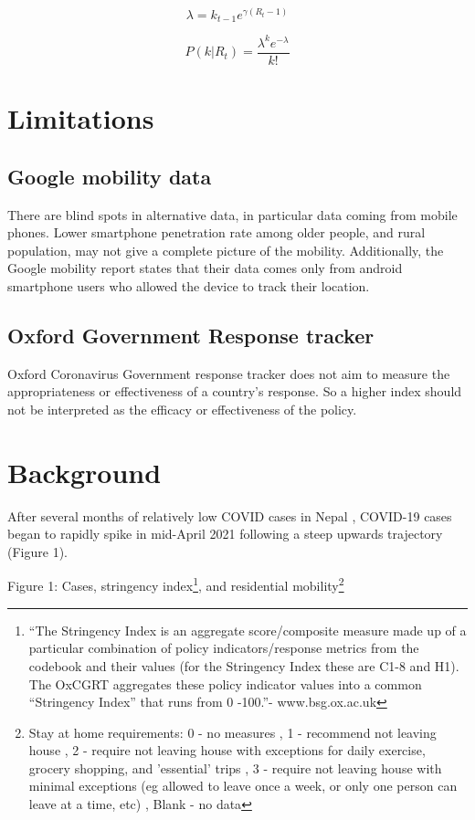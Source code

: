 \documentclass{article}
\begin{document}
$$ \lambda = k_{t-1}e^{\gamma(R_t-1)}$$

$$P\left(k|R_t\right) = \frac{\lambda^k e^{-\lambda}}{k!}$$
\section{Limitations}
\label{sec:headings}

\subsection{Google mobility data}
There are blind spots in alternative data, in particular data coming from mobile phones. Lower smartphone penetration rate among older people, and rural population, may not give a complete picture of the mobility. Additionally, the Google mobility report states that their data comes only from android smartphone users who allowed the device to track their location. 

\subsection{Oxford Government Response tracker}
Oxford Coronavirus Government response tracker does not aim to measure the appropriateness or effectiveness of a country’s response. So a higher index should not be interpreted as the efficacy or effectiveness of the policy. 

\section{Background}
After several months of relatively low COVID cases in Nepal , COVID-19 cases began to rapidly spike in mid-April 2021 following a steep upwards trajectory (Figure 1).

\textcolor{black!65}{Figure 1: Cases, stringency index\footnote{“The Stringency Index is an aggregate score/composite measure made up of a particular combination of policy indicators/response metrics from the codebook and their values (for the Stringency Index these are C1-8 and H1). The OxCGRT aggregates these policy indicator values into a common “Stringency Index” that runs from 0 -100.”- www.bsg.ox.ac.uk}, and residential mobility\footnote{Stay at home requirements: 0 - no measures , 1 - recommend not leaving house , 2 - require not leaving house with exceptions for daily exercise, grocery shopping, and 'essential' trips , 3 - require not leaving house with minimal exceptions (eg allowed to leave once a week, or only one person can leave at a time, etc) , Blank - no data}}
\end{document}
